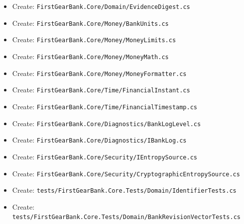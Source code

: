 \documentclass[
  10pt,
  letterpaper,
]{article}
\begin{document}
\begin{itemize}
\item
  Create:
  \texttt{FirstGearBank.}\allowbreak{}\texttt{Core/}\allowbreak{}\texttt{Domain/}\allowbreak{}\texttt{EvidenceDigest.}\allowbreak{}\texttt{cs}
\item
  Create:
  \texttt{FirstGearBank.}\allowbreak{}\texttt{Core/}\allowbreak{}\texttt{Money/}\allowbreak{}\texttt{BankUnits.}\allowbreak{}\texttt{cs}
\item
  Create:
  \texttt{FirstGearBank.}\allowbreak{}\texttt{Core/}\allowbreak{}\texttt{Money/}\allowbreak{}\texttt{MoneyLimits.}\allowbreak{}\texttt{cs}
\item
  Create:
  \texttt{FirstGearBank.}\allowbreak{}\texttt{Core/}\allowbreak{}\texttt{Money/}\allowbreak{}\texttt{MoneyMath.}\allowbreak{}\texttt{cs}
\item
  Create:
  \texttt{FirstGearBank.}\allowbreak{}\texttt{Core/}\allowbreak{}\texttt{Money/}\allowbreak{}\texttt{MoneyFormatter.}\allowbreak{}\texttt{cs}
\item
  Create:
  \texttt{FirstGearBank.}\allowbreak{}\texttt{Core/}\allowbreak{}\texttt{Time/}\allowbreak{}\texttt{FinancialInstant.}\allowbreak{}\texttt{cs}
\item
  Create:
  \texttt{FirstGearBank.}\allowbreak{}\texttt{Core/}\allowbreak{}\texttt{Time/}\allowbreak{}\texttt{FinancialTimestamp.}\allowbreak{}\texttt{cs}
\item
  Create:
  \texttt{FirstGearBank.}\allowbreak{}\texttt{Core/}\allowbreak{}\texttt{Diagnostics/}\allowbreak{}\texttt{BankLogLevel.}\allowbreak{}\texttt{cs}
\item
  Create:
  \texttt{FirstGearBank.}\allowbreak{}\texttt{Core/}\allowbreak{}\texttt{Diagnostics/}\allowbreak{}\texttt{IBankLog.}\allowbreak{}\texttt{cs}
\item
  Create:
  \texttt{FirstGearBank.}\allowbreak{}\texttt{Core/}\allowbreak{}\texttt{Security/}\allowbreak{}\texttt{IEntropySource.}\allowbreak{}\texttt{cs}
\item
  Create:
  \texttt{FirstGearBank.}\allowbreak{}\texttt{Core/}\allowbreak{}\texttt{Security/}\allowbreak{}\texttt{CryptographicEntropySource.}\allowbreak{}\texttt{cs}
\item
  Create:
  \texttt{tests/}\allowbreak{}\texttt{FirstGearBank.}\allowbreak{}\texttt{Core.}\allowbreak{}\texttt{Tests/}\allowbreak{}\texttt{Domain/}\allowbreak{}\texttt{IdentifierTests.}\allowbreak{}\texttt{cs}
\item
  Create:
  \texttt{tests/}\allowbreak{}\texttt{FirstGearBank.}\allowbreak{}\texttt{Core.}\allowbreak{}\texttt{Tests/}\allowbreak{}\texttt{Domain/}\allowbreak{}\texttt{BankRevisionVectorTests.}\allowbreak{}\texttt{cs}

\end{itemize}
\end{document}
